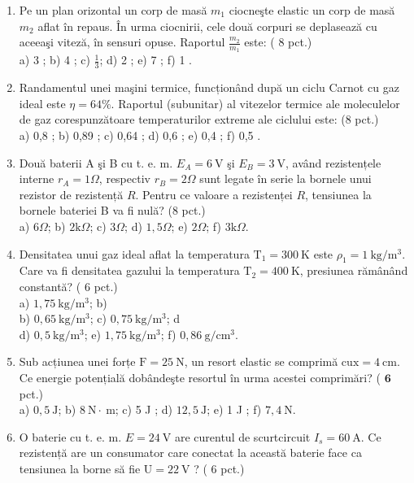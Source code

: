 
\begin{enumerate}
  \item Pe un plan orizontal un corp de masă $m_{1}$ ciocneşte elastic un corp de masă $m_{2}$ aflat în repaus. În urma ciocnirii, cele două corpuri se deplasează cu aceeaşi viteză, în sensuri opuse. Raportul $\frac{m_{2}}{m_{1}}$ este: ( 8 pct.)\\
a) 3 ; b) 4 ; c) $\frac{1}{3}$; d) 2 ; e) 7 ; f) 1 .
  \item Randamentul unei maşini termice, funcționând după un ciclu Carnot cu gaz ideal este $\eta=64 \%$. Raportul (subunitar) al vitezelor termice ale moleculelor de gaz corespunzătoare temperaturilor extreme ale ciclului este: (8 pct.)\\
a) 0,8 ; b) 0,89 ; c) 0,64 ; d) 0,6 ; e) 0,4 ; f) 0,5 .
  \item Două baterii A şi B cu t. e. m. $E_{A}=6 \mathrm{~V}$ şi $E_{B}=3 \mathrm{~V}$, având rezistențele interne $r_{A}=1 \Omega$, respectiv $r_{B}=2 \Omega$ sunt legate în serie la bornele unui rezistor de rezistență $R$. Pentru ce valoare a rezistenței $R$, tensiunea la bornele bateriei B va fi nulă? (8 pct.)\\
a) $6 \Omega$; b) $2 \mathrm{k} \Omega$; c) $3 \Omega$; d) $1,5 \Omega$; e) $2 \Omega$; f) $3 \mathrm{k} \Omega$.
  \item Densitatea unui gaz ideal aflat la temperatura $\mathrm{T}_{1}=300 \mathrm{~K}$ este $\rho_{1}=1 \mathrm{~kg} / \mathrm{m}^{3}$. Care va fi densitatea gazului la temperatura $\mathrm{T}_{2}=400 \mathrm{~K}$, presiunea rămânând constantă? ( 6 pct.)\\
a) $1,75 \mathrm{~kg} / \mathrm{m}^{3}$; b)\\
b) $0,65 \mathrm{~kg} / \mathrm{m}^{3}$; c) $0,75 \mathrm{~kg} / \mathrm{m}^{3}$; d\\
d) $0,5 \mathrm{~kg} / \mathrm{m}^{3}$; e) $1,75 \mathrm{~kg} / \mathrm{m}^{3}$; f) $0,86 \mathrm{~g} / \mathrm{cm}^{3}$.
  \item Sub acțiunea unei forțe $\mathrm{F}=25 \mathrm{~N}$, un resort elastic se comprimă $\mathrm{cu} \mathrm{x}=4 \mathrm{~cm}$. Ce energie potențială dobândeşte resortul în urma acestei comprimări? ( $\mathbf{6}$ pct.)\\
a) $0,5 \mathrm{~J}$; b) $8 \mathrm{~N} \cdot \mathrm{~m}$; c) 5 J ; d) $12,5 \mathrm{~J}$; e) 1 J ; f) $7,4 \mathrm{~N}$.
  \item O baterie cu t. e. m. $E=24 \mathrm{~V}$ are curentul de scurtcircuit $I_{s}=60 \mathrm{~A}$. Ce rezistență are un consumator care conectat la această baterie face ca tensiunea la borne să fie $\mathrm{U}=22 \mathrm{~V}$ ? ( 6 pct.)\\

\end{enumerate}

